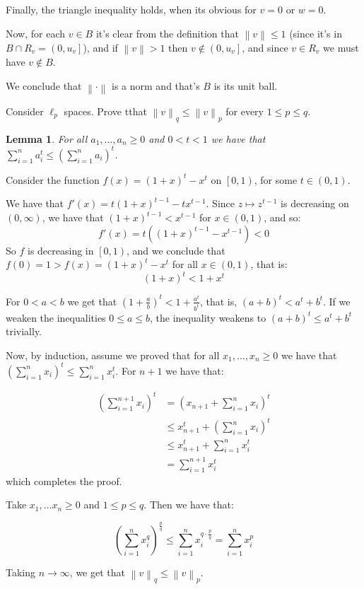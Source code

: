 \documentclass[11pt]{article} %
\newcommand{\norm}[1]{\left\lVert#1\right\rVert}
\newtheorem{lemma}{Lemma}
\begin{document}
\begin{Answer}
Finally, the triangle inequality holds, when its obvious for $v =0$ or $w =0$.

Now, for each $v \in B$ it's clear from the definition that $\norm{v} \leq 1$ (since it's in $B\cap R_v = \left(0, u_v\right]$), and if $\norm{v} > 1$ then $v \notin \left(0, u_v\right]$, and since $v \in R_v$ we must have $v \notin B$.

We conclude that $\norm{\cdot}$ is a norm and that's $B$ is its unit ball.
\end{Answer}

\begin{Exercise}
Consider $\ell _p$ spaces. Prove tthat $\norm{v}_q \leq \norm{v} _p$ for every $1 \leq p \leq q$.
\end{Exercise}

\begin{lemma}
For all $a_1, \dots, a_n \geq 0$ and $0 < t <1$ we have that $\sum_{i=1}^n a_i^t \leq \left( \sum_{i=1}^n a_i \right)^t$.
\end{lemma}
Consider the function $f\left(x\right) = \left(1 + x\right)^{t} - x^t $ on $\left[0,1\right)$, for some $t\in\left(0,1\right)$.

We have that $f'\left(x\right) = t\left(1 +x \right)^{t-1} - tx^{t-1}$. Since $z \mapsto z^{t-1}$ is decreasing on $\left(0, \infty\right)$, we have that $\left(1 + x\right)^{t-1} < x^{t-1}$ for $x \in \left(0,1\right)$, and so:
\[ f'\left(x\right) = t\left(\left(1 + x\right)^{t-1} - x^{t-1}\right) < 0\]
So $f$ is decreasing in $\left[0,1\right)$, and we conclude that $f\left(0\right) = 1 > f\left(x\right) = \left(1 + x\right)^t - x^t$  for all $x \in \left(0, 1\right)$, that is:
\[ \left(1 + x\right)^t < 1 + x^t \]

For $0 < a < b$ we get that $\left(1 + \frac{a}{b}\right)^t < 1 + \frac{a^t}{b^t}$, that is, $\left(a + b\right)^t < a^t + b^t$. If we weaken the inequalities $0 \leq a \leq b$, the inequality weakens to $\left(a + b\right)^t \leq a^t + b^t$ trivially.

Now, by induction, assume we proved that for all $x_1, \dots, x_n \geq 0$ we have that $\left( \sum_{i=1}^{n} x_i \right)^t \leq \sum_{i=1}^{n} x_i^t$. For $n+1$ we have that:

\begin{equation}
\begin{split}
\left(\sum_{i=1}^{n+1} x_i \right)^t & = \left(x_{n+1} + \sum_{i=1}^{n} x_i\right)^t \\
& \leq x_{n+1}^t +\left(\sum_{i=1}^n x_i\right)^t \\
& \leq x_{n+1}^t +\sum_{i=1}^n x_i^t \\
& = \sum_{i=1}^{n+1} x_i^t
\end{split}
\end{equation}
which completes the proof.

\begin{Answer}
Take $x_1, \dots x_n \geq 0$ and $1 \leq p \leq q$. Then we have that:

\[ \left(\sum_{i=1}^n x_i^q\right)^{\frac{p}{q}} \leq \sum_{i=1}^{n} x_i^{q\cdot\frac{p}{q}}  = \sum_{i=1}^{n} x_i ^p \]

Taking $n \to \infty$, we get that $\norm{v}_q \leq \norm{v}_p$.
\end{Answer}
\end{document}
